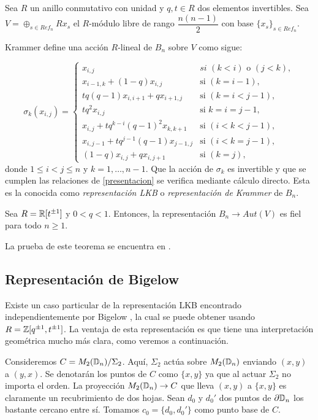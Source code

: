 \documentclass[TFG.tex]{subfiles}
\begin{document}
Sea $R$ un anillo conmutativo con unidad y $q,t\in R$ dos elementos invertibles. Sea $V=\oplus_{s\in Ref_n}Rx_s$ el $R$-módulo libre de rango $\dfrac{n(n-1)}{2}$ con base $\{x_s\}_{s\in Ref_n}$. 

Krammer \cite{Krammer} define una acción $R$-lineal de $B_n$ sobre $V$ como sigue:


\begin{equation}\label{LKB}
\sigma_k(x_{i,j})=\begin{cases}
x_{i,j} & \textit{si }(k<i)\text{ o }(j<k),\\
x_{i-1,k}+(1-q)x_{i,j} & \text{si } (k=i-1),\\
tq(q-1)x_{i,i+1}+qx_{i+1,j} & \text{si }(k=i<j-1),\\
tq^2x_{i,j} & \text{si }k=i=j-1,\\
x_{i,j}+tq^{k-i}(q-1)^2x_{k,k+1} & \text{si }(i<k<j-1),\\
x_{i,j-1}+tq^{j-1}(q-1)x_{j-1,j} & \text{si }(i<k=j-1),\\
(1-q)x_{i,j}+qx_{i,j+1} & \text{si }(k=j),
\end{cases}
\end{equation}
donde $1\leq i<j\leq n$ y $k=1,\dots, n-1$. Que la acción de $\sigma_k$ es invertible y que se cumplen las relaciones de \ref{presentacion} se verifica mediante cálculo directo. Esta es la conocida como \emph{representación LKB} o \emph{representación de Krammer} de $B_n$.


\begin{teorema}
Sea $R=\mathbb{R}[t^{\pm 1}]$ y $0<q<1$. Entonces, la representación $B_n\to Aut(V)$ es fiel para todo $n\geq 1$.
\end{teorema}

La prueba de este teorema se encuentra en \cite{Krammer}.


\subsection{Representación de Bigelow}
Existe un caso particular de la representación LKB encontrado independientemente por Bigelow \cite{Bil}, la cual se puede obtener usando $R=\mathbb{Z}[q^{\pm 1},t^{\pm 1}]$. La ventaja de esta representación es que tiene una interpretación geométrica mucho más clara, como veremos a continuación.

Consideremos $C=M_2(\mathbb{D}_n)/\Sigma_2$. Aquí, $\Sigma_2$ actúa sobre $M_2(\mathbb{D}_n)$ enviando $(x,y)$ a $(y,x)$. Se denotarán los puntos de $C$ como $\{x,y\}$ ya que al actuar $\Sigma_2$ no importa el orden. La proyección $M_2(\mathbb{D}_n)\to C$ que lleva $(x,y)$ a $\{x,y\}$ es claramente un recubrimiento de dos hojas. Sean $d_0$ y $d_0'$ dos puntos de $\partial\mathbb{D}_n$ los bastante cercano entre sí. Tomamos $c_0=\{d_0,d_0'\}$ como punto base de $C$.
\end{document}
